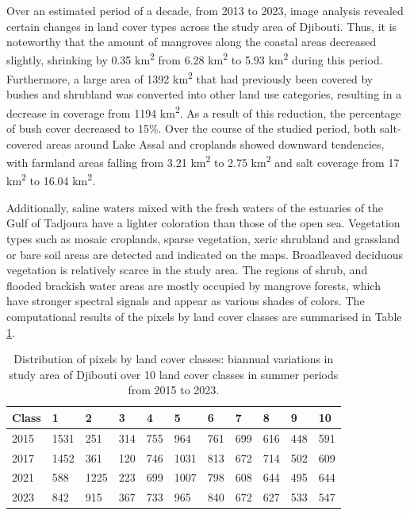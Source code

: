 \documentclass[jimaging,article,accept,pdftex,moreauthors]{Definitions/mdpi}
\begin{document}
{{Over an estimated period of a decade, from 2013 to 2023,} %
image analysis revealed certain changes in land cover types across the study area of Djibouti. Thus, it is noteworthy that the amount of mangroves along the coastal areas decreased slightly, shrinking by 0.35 km\textsuperscript{2} from 6.28 km\textsuperscript{2} to 5.93 km\textsuperscript{2} during this period. Furthermore, a large area of 1392 km\textsuperscript{2} that had previously been covered by bushes and shrubland was converted into other land use categories, resulting in a decrease in coverage from 1194 km\textsuperscript{2}. As a result of this reduction, the percentage of bush cover decreased {to} %
15\%. Over the course of the studied period, {both salt-covered areas around Lake Assal and croplands} %
showed downward tendencies, with farmland areas falling from 3.21 km\textsuperscript{2} to 2.75 km\textsuperscript{2} and salt coverage from 17 km\textsuperscript{2} to 16.04 km\textsuperscript{2}.}

Additionally, saline waters mixed with the fresh waters of the estuaries of the Gulf of Tadjoura have a lighter coloration than those of the open sea. Vegetation types such as mosaic croplands, sparse vegetation, xeric shrubland and grassland or bare soil areas are detected and indicated on the maps. Broadleaved deciduous vegetation is relatively scarce in the study area. The regions of shrub, and flooded brackish water areas are mostly occupied by mangrove forests, which have stronger spectral signals and appear as various shades of colors. The computational results of the pixels by land cover classes are summarised in Table \ref{tab04}.

\begin{table}[H]
\caption{Distribution of pixels by land cover classes: biannual variations in study area of Djibouti over 10 land cover classes in summer periods from 2015 to 2023.}\label{tab04}

\begin{tabularx}{\textwidth}{ p{1.5cm}  X  X  X  X  X  X  X  X  X  X  }
  \toprule
   \textbf{Class} & \textbf{1} & \textbf{2} & \textbf{3} & \textbf{4} & \textbf{5} & \textbf{6} & \textbf{7} & \textbf{8} & \textbf{9} & \textbf{10} \\
   \midrule
    2015 & 1531 & 251 & 314 & 755 & 964 & 761 & 699 & 616 & 448 & 591 \\
    2017 & 1452 & 361 & 120 & 746 & 1031 & 813 & 672 & 714 & 502 & 609 \\
    2021 & 588 & 1225 & 223 & 699 & 1007 & 798 & 608 & 644 & 495 & 644 \\
    2023 & 842 & 915 & 367 & 733 & 965 & 840 & 672 & 627 & 533 & 547 \\
    \bottomrule
\end{tabularx}

\end{table}
\end{document}
